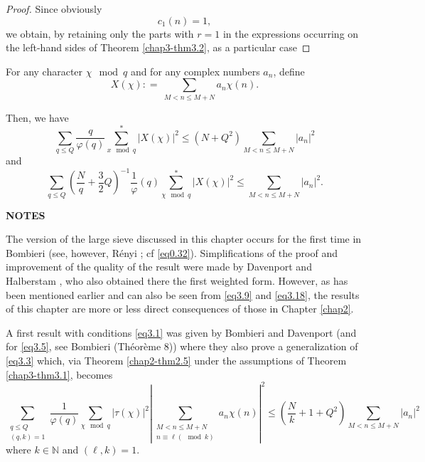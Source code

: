 \begin{proof}
Since obviously
\begin{equation*}
c_1(n) = 1, \tag{3.21}\label{eq3.21}
\end{equation*}
we obtain, by retaining only the parts with $r=1$ in the expressions
occurring on the left-hand sides of Theorem \ref{chap3-thm3.2}, as a
particular case 
\end{proof}

\begin{theorem}\label{chap3-thm3.3} %
For any character $\chi\mod q$ and for any complex numbers $a_n$, define
\begin{equation*}
X(\chi): = ~ \sum_{M < n\le M+N}a_n \chi(n). \tag{3.22}\label{eq3.22}
\end{equation*}
\end{theorem}

Then, we have
\begin{equation*}
\sum_{q \leq Q} \frac{q}{\varphi (q)}  \sum_{x \mod q}^*  |X(\chi)|^2
\leq (N+Q^2) \sum_{M < n \leq M+N} |a_n|^2 \tag{3.23}\label{eq3.23} 
\end{equation*}
and 
\begin{equation*}
\sum_{q \leq Q} (\frac{N}{q} + \frac{3}{2}Q)^{-1} \frac{1}{\varphi}(q)
\sum^*_{\chi \mod q}  |X(\chi)|^2 \leq \sum_{M < n\leq M+N}
|a_n|^2. \tag{3.24}\label{eq3.24} 
\end{equation*} 

\medskip
\begin{center}  
{\bf NOTES}\pageoriginale 
 \end{center} 
 
The version of the large sieve discussed in this chapter occurs for the
first time in Bombieri \cite{key1} (see, however, R\'enyi \cite{key2};
cf \eqref{eq0.32}). Simplifications of the proof and improvement of
the quality of the result were made by Davenport and Halberstam
\cite{key1}, who also obtained there the first weighted form. However,
as has been mentioned earlier and can also be seen from \eqref{eq3.9}
and \eqref{eq3.18}, the results of this chapter are more or less direct
consequences of those in Chapter \ref{chap2}.

A first result with conditions \eqref{eq3.1} was given by Bombieri and
Davenport \cite{key2} (and for \eqref{eq3.5}, see Bombieri \cite{key6}
(Th\'eor\`eme 8)) where they also prove a generalization of
\eqref{eq3.3} which, via Theorem \ref{chap2-thm2.5} under the
assumptions of Theorem \ref{chap3-thm3.1}, becomes 
\begin{equation*}
\sum_{\substack {q\leq Q \\(q,k)=1}}  \frac{1}{\varphi(q)} \sum_{\chi
  \mod q} |\tau (\chi)|^2 | \sum_{\substack {M < n \leq M+N \\  n
    \equiv \ell (\mod k)}} a_n \chi(n)|^2 \leq (\frac{N}{k} + 1 + Q^2)
\sum_{M < n \leq M+N} |a_n|^2  \tag{3.25}\label{eq3.25} 
\end{equation*} 
where $k \in \mathbb{N}$ and $(\ell,k) = 1$.
  
